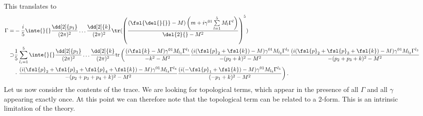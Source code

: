 This translates to
\begin{align*}
	\Gamma =&  -\frac{i}{5}\inte{}{}\frac{\dd[2]{p_{1}}}{(2\pi)^{2}}\dots\frac{\dd[2]{k}}{(2\pi)^{2}}\tr(\left(\frac{(\fsl{\del{}{}} - M)\left(m + i\gamma^{01}\sum\limits_{l = 1}^{5}M_{l}\Gamma^{l}\right)}{\del{2}{} - M^{2}}\right)^{5}) \\
	\supset&  \frac{1}{5}\sum\limits_{l_{i} = 1}^{5}\inte{}{}\frac{\dd[2]{p_{1}}}{(2\pi)^{2}}\dots\frac{\dd[2]{k}}{(2\pi)^{2}}\text{tr}\left(\frac{(i\fsl{k} - M)\gamma^{01}M_{l_{1}}\Gamma^{l_{1}}}{-k^{2} - M^{2}}\frac{(i(\fsl{p}_{2} + \fsl{k}) - M)\gamma^{01}M_{l_{2}}\Gamma^{l_{2}}}{-(p_{2} + k)^{2} - M^{2}}\frac{(i(\fsl{p}_{2} + \fsl{p}_{3} + \fsl{k}) - M)\gamma^{01}M_{l_{3}}\Gamma^{l_{3}}}{-(p_{2} + p_{3} + k)^{2} - M^{2}} \right. \\
	&\cdot \left.\frac{(i(\fsl{p}_{2} + \fsl{p}_{3} + \fsl{p}_{4} + \fsl{k}) - M)\gamma^{01}M_{l_{4}}\Gamma^{l_{4}}}{-(p_{2} + p_{3} + p_{4} + k)^{2} - M^{2}}\frac{(i(-\fsl{p}_{1} + \fsl{k}) - M)\gamma^{01}M_{l_{5}}\Gamma^{l_{5}}}{(-p_{1} + k)^{2} - M^{2}}\right).
\end{align*}
Let us now consider the contents of the trace. We are looking for topological terms, which appear in the presence of all $\Gamma$ and all $\gamma$ appearing exactly once. At this point we can therefore note that the topological term can be related to a $2$-form. This is an intrinsic limitation of the theory.

